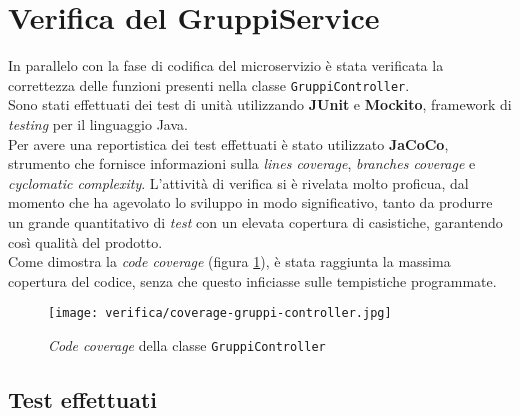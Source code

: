 \section{Verifica del GruppiService}
In parallelo con la fase di codifica del \gls{microservizio}
 è stata verificata la correttezza delle funzioni
presenti nella classe \texttt{GruppiController}. \\
Sono stati effettuati dei test di unità utilizzando \textbf{JUnit} e
\textbf{Mockito}, \gls{framework} di \textit{testing} per il linguaggio Java.\\
Per avere una reportistica dei test effettuati è stato utilizzato
\textbf{JaCoCo}, strumento che fornisce informazioni sulla \textit{lines
      coverage}, \textit{branches coverage} e \textit{cyclomatic complexity}.
L'attività di verifica si è rivelata molto proficua, dal momento che ha agevolato lo sviluppo in
modo significativo, tanto da produrre un grande quantitativo di \textit{test}
con un elevata copertura di casistiche, garantendo così qualità del prodotto.\\
Come dimostra la \textit{code coverage} (figura \ref{img:code-coverage}), è
stata raggiunta la massima copertura del codice, senza che questo inficiasse
sulle tempistiche programmate.

\begin{figure}[H]

      \centerline{\texttt{[image: verifica/coverage-gruppi-controller.jpg]}}

      \caption{\textit{Code coverage} della classe \texttt{GruppiController}}
      \label{img:code-coverage}
\end{figure}

\subsection{Test effettuati}



